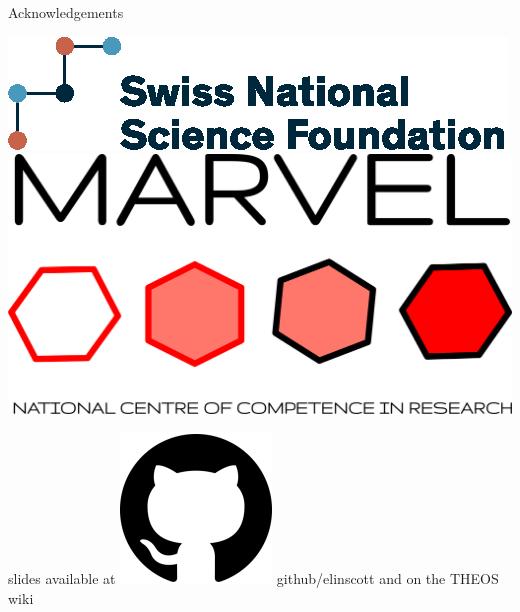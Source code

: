 \documentclass[xcolor=table,aspectratio=169]{beamer}
\numberwithin{equation}{section}
\newcommand{\insertframeinfo}{\insertframenumber/\inserttotalframenumber}
\newcommand{\backupbegin}{
   \newcounter{finalframe}
   \setcounter{finalframe}{\value{framenumber}}
   \renewcommand{\insertframeinfo}{}
}
\newcommand{\backupend}{
   \setcounter{framenumber}{\value{finalframe}}
}
\begin{document}
\begin{frame}{Acknowledgements}
   \begin{center}
      \includegraphics[height = 0.15\paperheight]{logos/SNF_logo_standard_print_color_pos_e.eps}
      \hspace{3em}
      \includegraphics[height = 0.15\paperheight]{figures/marvel_trimmed.png}
   \end{center}

   \vspace{1ex}

   \begin{center}
      slides available at \includegraphics[height=\fontcharht\font`\B]{logos/github-favicon.png} github/elinscott and on the THEOS wiki
   \end{center}

   \vspace{2ex}
   \scriptsize


   \vspace{2ex}
   \scriptsize
\end{frame}
\endgroup
% 
% 
% 
% 
% 
\end{document}
